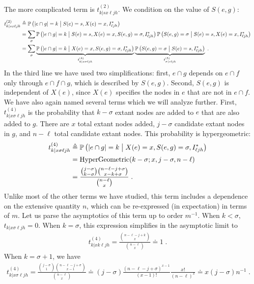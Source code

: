 The more complicated term is $t^{(2)}_{k|sx\ell jh}$. 
We condition on the value of $S(e,g)$:
\begin{align}
    t^{(2)}_{k|sx\ell jh} &\eqdef \prob{\abs{e\cap g} = k \given S(e) = s, X(e) = x, I^*_{\ell j h}} \\ 
    &= \sum_{\sigma} \prob{\abs{e\cap g} = k \given S(e) = s, X(e) = x, S(e,g) = \sigma, I^*_{\ell j h}} \prob{S(e,g) = \sigma \given S(e) = s, X(e) = x, I^*_{\ell j h}} \\ 
    &= \sum_{\sigma} \underbrace{\prob{\abs{e\cap g} = k \given  X(e) = x, S(e,g) = \sigma, I^*_{\ell j h}}}_{t^{(4)}_{k|x\sigma \ell jh}} \underbrace{\prob{S(e,g) = \sigma \given S(e) = s,  I^*_{\ell j h}}}_{t^{(5)}_{\sigma | s \ell jh}} \;.
\end{align}
In the third line we have used two simplifications: first, $e\cap g$ depends on $e\cap f$ only through $e \cap f \cap g$, which is described by $S(e, g)$. 
Second, $S(e,g)$ is independent of $X(e)$, since $X(e)$ specifies the nodes in $e$ that are not in $e\cap f$.
We have also again named several terms which we will analyze further. 
First, $t^{(4)}_{k|x\sigma \ell jh}$ is the probability that $k - \sigma$ extant nodes are added to $e$ that are also added to $g$. 
There are $x$ total extant nodes added, $j - \sigma$ candidate extant nodes in $g$, and $n - \ell$ total candidate extant nodes. 
This probability is hypergeometric: 
\begin{align}
    t^{(4)}_{k|x\sigma \ell jh} &\eqdef \prob{\abs{e\cap g} = k \given  X(e) = x, S(e,g) = \sigma, I^*_{\ell j h}}  \\ 
    &= \mathrm{HyperGeometric}(k - \sigma; x, j - \sigma, n - \ell)  \\ 
    &= \frac{\binom{j - \sigma}{k - \sigma}\binom{n - \ell - j + \sigma}{x - k + \sigma}}{\binom{n-\ell}{x}}\;. \label{eq:t4}    
\end{align}
Unlike most of the other terms we have studied, this term includes a dependence on the extensive quantity $n$, which can be re-expressed (in expectation) in terms of $m$.
Let us parse the asymptotics of this term up to order $m^{-1}$. 
When $k < \sigma$, $t_{k|x\sigma\ell jh} = 0$. 
When $k = \sigma$, this expression simplifies in the asymptotic limit to 
\begin{align}
    t^{(4)}_{k|xk\ell jh} = \frac{\binom{n - \ell - j + k}{x}}{\binom{n-\ell}{x}} \doteq 1\;.
\end{align}
When $k = \sigma + 1$, we have 
\begin{align}
    t^{(4)}_{k|x\sigma\ell jh} = \frac{\binom{j-\sigma}{1} \binom{n-\ell - j + \sigma}{x-1}}{\binom{n-\ell}{x}} \doteq (j-\sigma) \frac{{(n-\ell - j + \sigma)}^{x-1}}{(x-1)!} \frac{x!}{(n -\ell)^x} \doteq x(j-\sigma)n^{-1}\;. 
\end{align}
